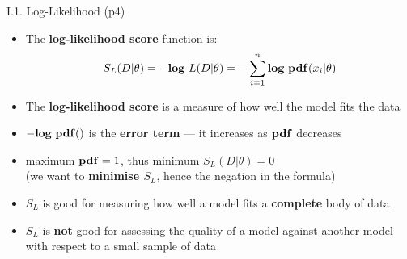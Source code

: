 \documentclass[handout]{beamer}
\newcommand{\strong}[1]{\textbf{\color{teal} #1}}
\newcommand{\stronger}[1]{\textbf{\color{purple} #1}}
\begin{document}
\begin{frame}{I.1. Log-Likelihood (p4)}
\begin{itemize}
\item The \stronger{log-likelihood score} function is:
\[
S_L(D|\theta) = - {\bf log} ~ L(D|\theta) = - \sum_{i=1}^{n}{{ \bf log ~ pdf}( x_i | \theta ) }
\]
\item The \textbf{log-likelihood score} is a measure of how well the model fits the data
\item $- {\bf log ~ pdf}()$ is the \strong{error term} --- it increases as ${\bf pdf}$ decreases
\item maximum ${\bf pdf} = 1$, thus minimum $S_L(D|\theta) = 0$\\
(we want to \textbf{minimise $S_L$}, hence the negation in the formula)
\item $S_L$ is good for measuring how well a model fits a \stronger{complete} body of data
\item $S_L$ is \textbf{not} good for assessing the quality of a model against another model with respect to a small sample of data
\end{itemize}
\end{frame}



\end{document}
